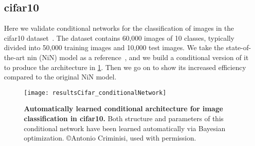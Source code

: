 \documentclass[thesis]{subfiles}
\begin{document}
	
	\subsection{\gls{cifar10}}
	Here we validate conditional networks for the classification of images in the \gls{cifar10} dataset~\citep{CIFAR10}. 
	The dataset contains 60,000 images of 10 classes, typically divided into 50,000 training images and 10,000 test images. 
	We take the state-of-the-art \gls{nin} (NiN) model 
	as a reference~\citep{Lin2013NiN}, and we build a conditional version of it to produce the architecture in \cref{fig:Cifar_CondNet}. 
	Then we go on to show its increased efficiency compared to the original NiN model.
	
	\begin{figure}[tbp]
		\centerline{
			\texttt{[image: resultsCifar\_conditionalNetwork]}
		}
		\caption[Automatically-learned conditional architecture for \gls{cifar10}]{\textbf{Automatically learned conditional architecture for image classification in \gls{cifar10}.} Both structure and parameters of this conditional network have been learned automatically via Bayesian optimization. \copyright Antonio Criminisi, used with permission.}
		\label{fig:Cifar_CondNet}
	\end{figure}
	
\end{document}
